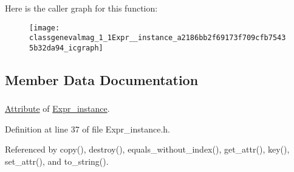 Here is the caller graph for this function:\nopagebreak
\begin{figure}[H]
\begin{center}
\leavevmode
\texttt{[image: classgenevalmag\_1\_1Expr\_\_instance\_a2186bb2f69173f709cfb75435b32da94\_icgraph]}
\end{center}
\end{figure}




\subsection{Member Data Documentation}
\hypertarget{classgenevalmag_1_1Expr__instance_a3513fb59dae64c17da188dc3ad10fc53}{
\subsubsection[{i\_\-attr}]{}}
\label{classgenevalmag_1_1Expr__instance_a3513fb59dae64c17da188dc3ad10fc53}


\hyperlink{classgenevalmag_1_1Attribute}{Attribute} of \hyperlink{classgenevalmag_1_1Expr__instance}{Expr\_\-instance}. 



Definition at line 37 of file Expr\_\-instance.h.



Referenced by copy(), destroy(), equals\_\-without\_\-index(), get\_\-attr(), key(), set\_\-attr(), and to\_\-string().

\hypertarget{classgenevalmag_1_1Expr__instance_af8d85fabc65cf8133ed5b1f7a6fa925b}{
\subsubsection[{i\_\-num}]{}}
\label{classgenevalmag_1_1Expr__instance_af8d85fabc65cf8133ed5b1f7a6fa925b}


